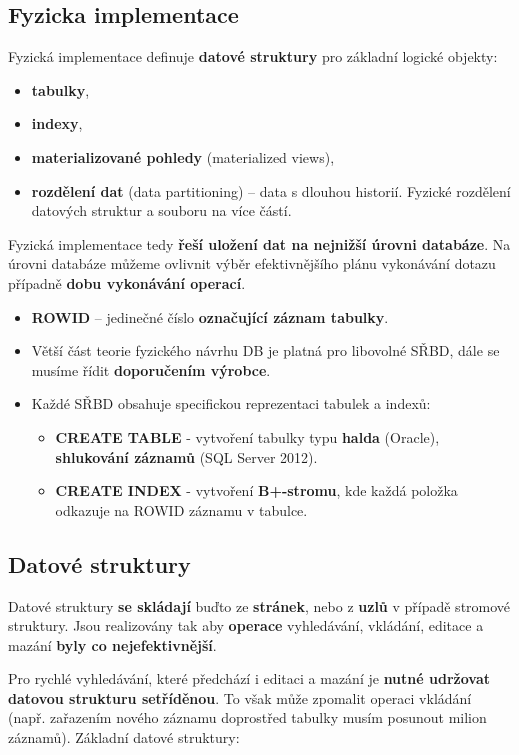 \subsection{Fyzicka implementace}
Fyzická implementace definuje \textbf{datové struktury} pro základní logické objekty:

\begin{itemize}
\item \textbf{tabulky},
\item \textbf{indexy},
\item \textbf{materializované pohledy} (materialized views),
\item \textbf{rozdělení dat} (data partitioning) --  data s dlouhou historií. Fyzické rozdělení datových struktur a souboru na více částí.
\end{itemize}

Fyzická implementace tedy \textbf{řeší uložení dat na nejnižší úrovni databáze}.
 Na úrovni databáze můžeme ovlivnit výběr efektivnějšího plánu vykonávání dotazu případně \textbf{dobu vykonávání operací}.

\begin{itemize}
\item \textbf{ROWID} -- jedinečné číslo \textbf{označující záznam tabulky}.
\item Větší část teorie fyzického návrhu DB je platná pro libovolné SŘBD, dále se musíme řídit \textbf{doporučením výrobce}.
\item Každé SŘBD obsahuje specifickou reprezentaci tabulek a indexů:
\begin{itemize}
\item \textbf{CREATE TABLE} - vytvoření tabulky typu \textbf{halda} (Oracle), \textbf{shlukování záznamů} (SQL Server 2012).
\item \textbf{CREATE INDEX} - vytvoření\textbf{ B+-stromu}, kde každá položka odkazuje na ROWID záznamu v tabulce.
\end{itemize}
\end{itemize}

\subsection{Datové struktury}
Datové struktury \textbf{se skládají} buďto ze \textbf{stránek}, nebo z \textbf{uzlů} v případě stromové struktury. Jsou realizovány tak aby \textbf{operace} vyhledávání, vkládání, editace a mazání \textbf{byly co nejefektivnější}. 

Pro rychlé vyhledávání, které předchází i editaci a mazání je \textbf{nutné udržovat datovou strukturu setříděnou}. To však může zpomalit operaci vkládání (např. zařazením nového záznamu doprostřed tabulky musím posunout milion záznamů).
Základní datové struktury:

